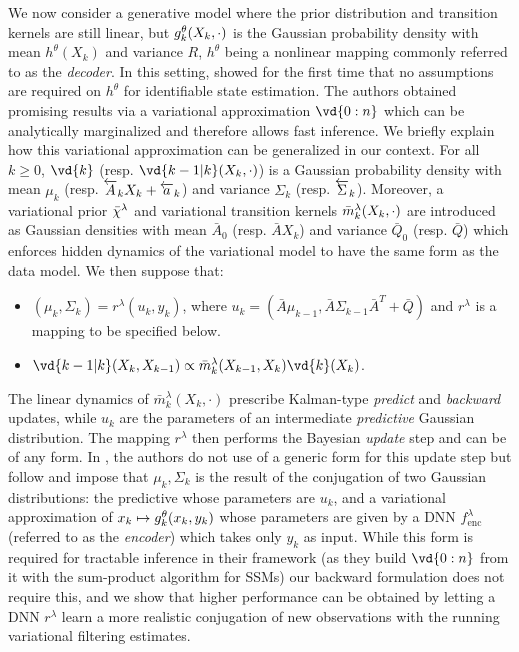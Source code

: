 \documentclass{article}
\begin{document}
We now consider a generative model where the prior distribution and transition kernels are still linear, but $g_{k}^{\theta}(X_k,\cdot)$ is the Gaussian probability density with mean $h^\theta(X_k)$ and variance $R$, $h^\theta$ being a nonlinear mapping commonly referred to as the \textit{decoder}. In this setting, \cite{Hlv2021DisentanglingIF} showed for the first time that no assumptions are required on $h^\theta$ for identifiable state estimation. The authors obtained promising results via a variational approximation $\vd{0:n}$ which can be analytically marginalized and therefore allows fast inference. We briefly explain how this variational approximation can be generalized in our context. For all $k \geq 0$, $\vd{k}$ (resp. $\vd{k-1|k}(X_k,\cdot)$) is a Gaussian probability density with mean $\mu_k$ (resp. $\overleftarrow{A}_k X_k + \overleftarrow{a}_k$) and variance $\Sigma_k$ (resp.  $\overleftarrow{\Sigma}_k$).  Moreover, a variational prior $\bar{\chi}^\lambda$ and variational transition kernels $\bar{m}_k^\lambda(X_k, \cdot)$ are introduced as Gaussian densities with mean $\bar{A}_0$ (resp. $\bar{A} X_k$) and variance $\bar{Q}_0$ (resp. $\bar{Q}$) which enforces hidden dynamics of the variational model to have the same form as the data model. 
We then suppose that:
\begin{itemize}
    \item $\left(\mu_k, \Sigma_k\right) = r^\lambda(u_k, y_k)$, where $u_k = (\bar{A}\mu_{k-1}, \bar{A} \Sigma_{k-1} \bar{A}^T + \bar{Q})$ and $r^\lambda$ is a mapping to be specified below.
    \item $\vd{k-1|k}(X_k, X_{k-1}) \propto  \bar{m}_k^\lambda(X_{k-1}, X_k) \vd{k}(X_k)$.
\end{itemize}
The linear dynamics of $\bar{m}_k^\lambda(X_k, \cdot)$ prescribe Kalman-type \textit{predict} and \textit{backward} updates, while $u_k$ are the parameters of an intermediate \textit{predictive} Gaussian distribution. The mapping $r^\lambda$ then performs the Bayesian \textit{update} step and can be of any form. 
In \cite{Hlv2021DisentanglingIF}, the authors do not use of a generic form for this update step but follow \cite{johnson2016} and impose that $\mu_k,\Sigma_k$ is the result of the conjugation of two Gaussian distributions: the predictive whose parameters are $u_k$, and a variational approximation of $x_k \mapsto g_{k}^{\theta}(x_k, y_k)$ whose parameters are given by a DNN $f_{\mathrm{enc}}^\lambda$ (referred to as the \textit{encoder}) which takes only $y_k$ as input. While this form is required for tractable inference in their framework (as they build $\vd{0:n}$ from it with the sum-product algorithm for SSMs)  our backward formulation does not require this, and we show that higher performance can be obtained by letting a DNN $r^\lambda$ learn a more realistic conjugation of new observations with the running variational filtering estimates. 
\end{document}
